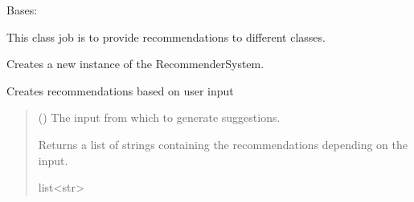 \documentclass[letterpaper,10pt,english]{sphinxmanual}
\begin{document}
\begin{fulllineitems}
\label{\detokenize{apidoc/src.osm_configurator.model.application:src.osm_configurator.model.application.recommender_system.RecommenderSystem}}
\pysigstartsignatures
{}
\pysigstopsignatures
\sphinxAtStartPar
Bases: 

\sphinxAtStartPar
This class job is to provide recommendations to different classes.

\begin{fulllineitems}
\label{\detokenize{apidoc/src.osm_configurator.model.application:src.osm_configurator.model.application.recommender_system.RecommenderSystem.__init__}}
\pysigstartsignatures
{}
\pysigstopsignatures
\sphinxAtStartPar
Creates a new instance of the RecommenderSystem.

\end{fulllineitems}


\begin{fulllineitems}
\label{\detokenize{apidoc/src.osm_configurator.model.application:src.osm_configurator.model.application.recommender_system.RecommenderSystem.recommend}}
\pysigstartsignatures
{}
\pysigstopsignatures
\sphinxAtStartPar
Creates recommendations based on user input
\begin{quote}\begin{description}
\sphinxAtStartPar
{} () \textendash{} The input from which to generate suggestions.

\sphinxAtStartPar
Returns a list of strings containing the recommendations depending on the input.

\sphinxAtStartPar
list\textless{}str\textgreater{}

\end{description}\end{quote}

\end{fulllineitems}


\end{fulllineitems}
\end{document}
